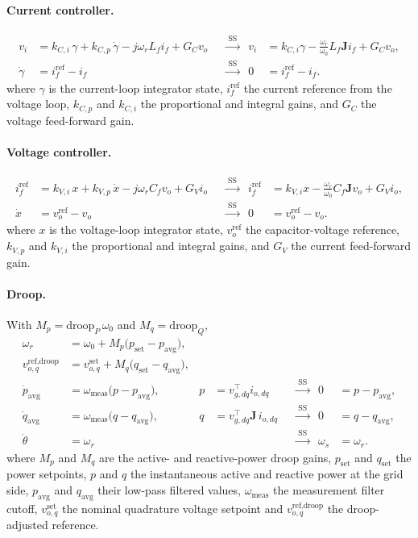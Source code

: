 \documentclass[11pt]{article}
\newcommand{\wnom}{\omega_0}
\newcommand{\wsys}{\omega_s}
\newcommand{\wrot}{\omega_r}
\newcommand{\Jmat}{\bm{J}}
\begin{document}
\paragraph{Current controller.}
\begin{align}
  v_i &= k_{C,i}\,\gamma + k_{C,p}\,\dot{\gamma} - j\wrot L_f i_f + G_C v_o
    &&\xrightarrow{\;\text{SS}\;}& v_i &= k_{C,i}\gamma - \tfrac{\wrot}{\wnom}L_f\Jmat i_f + G_C v_o,\\
  \dot{\gamma} &= i_{f}^{\text{ref}} - i_f
    &&\xrightarrow{\;\text{SS}\;}& 0 &= i_{f}^{\text{ref}} - i_f .
\end{align}
where $\gamma$ is the current-loop integrator state, $i_f^{\text{ref}}$ the
current reference from the voltage loop, $k_{C,p}$ and $k_{C,i}$ the
proportional and integral gains, and $G_C$ the voltage feed-forward gain.

\paragraph{Voltage controller.}
\begin{align}
  i_f^{\text{ref}} &= k_{V,i}\,x + k_{V,p}\,\dot{x} - j\wrot C_f v_o + G_V i_o
    &&\xrightarrow{\;\text{SS}\;}& i_f^{\text{ref}} &= k_{V,i}x - \tfrac{\wrot}{\wnom}C_f\Jmat v_o + G_V i_o,\\
  \dot{x} &= v_o^{\text{ref}} - v_o
    &&\xrightarrow{\;\text{SS}\;}& 0 &= v_o^{\text{ref}} - v_o .
\end{align}
where $x$ is the voltage-loop integrator state, $v_o^{\text{ref}}$ the
capacitor-voltage reference, $k_{V,p}$ and $k_{V,i}$ the proportional and
integral gains, and $G_V$ the current feed-forward gain.

\paragraph{Droop.}
With $M_p = \text{droop}_P\,\wnom$ and $M_q = \text{droop}_Q$,
\begin{align}
  \wrot &= \wnom + M_p\big(p_{\text{set}} - p_{\text{avg}}\big), \\
  v_{o,q}^{\text{ref,droop}} &= v_{o,q}^{\text{set}} + M_q\big(q_{\text{set}} - q_{\text{avg}}\big), \\
  \dot{p}_{\text{avg}} &= \omega_{\text{meas}}\big(p - p_{\text{avg}}\big),
    & p &= v_{g,dq}^\top i_{o,dq}
    &&\xrightarrow{\;\text{SS}\;}& 0 &= p - p_{\text{avg}}, \\
  \dot{q}_{\text{avg}} &= \omega_{\text{meas}}\big(q - q_{\text{avg}}\big),
    & q &= v_{g,dq}^\top \Jmat\, i_{o,dq}
    &&\xrightarrow{\;\text{SS}\;}& 0 &= q - q_{\text{avg}}, \\
  \dot{\theta} &= \wrot &&&&\xrightarrow{\;\text{SS}\;}& \wsys &= \wrot .
\end{align}
where $M_p$ and $M_q$ are the active- and reactive-power droop gains,
$p_{\text{set}}$ and $q_{\text{set}}$ the power setpoints, $p$ and $q$ the
instantaneous active and reactive power at the grid side,
$p_{\text{avg}}$ and $q_{\text{avg}}$ their low-pass filtered values,
$\omega_{\text{meas}}$ the measurement filter cutoff,
$v_{o,q}^{\text{set}}$ the nominal quadrature voltage setpoint and
$v_{o,q}^{\text{ref,droop}}$ the droop-adjusted reference.
\end{document}
